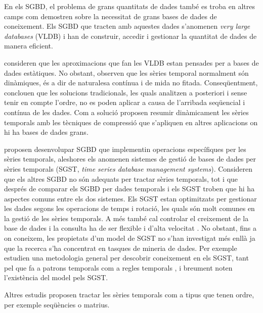  
En els SGBD, el problema de grans quantitats de dades també es troba en altres camps com demostren \textcite{mylopoulos96} sobre la necessitat de grans bases de dades de coneixement. Els SGBD que tracten amb aquestes dades s'anomenen \emph{very large databases} (VLDB) i han de construir, accedir i gestionar la quantitat de dades de manera eficient.

\textcite{ogras06} consideren que les aproximacions que fan les VLDB
estan pensades per a bases de dades estàtiques. No obstant, observen
que les sèries temporal normalment són dinàmiques, és a dir de
naturalesa contínua i de mida no fitada. Conseqüentment, conclouen que
les solucions tradicionals, les quals analitzen a posteriori i sense
tenir en compte l'ordre, no es poden aplicar a causa de l'arribada
seqüencial i contínua de les dades.  Com a solució proposen resumir
dinàmicament les sèries temporals amb les tècniques de compressió que
s'apliquen en altres aplicacions on hi ha bases de dades grans.




\textcite{dreyer94} proposen desenvolupar SGBD que implementin operacions específiques per les sèries temporals, aleshores els anomenen sistemes de gestió de bases de dades per sèries temporals (SGST, \emph{time series database management systems}). Consideren que els altres SGBD no són adequats per tractar sèries temporals, tot i que després de comparar els SGBD per dades temporals i els SGST \parencite{schmidt95} troben que hi ha aspectes comuns entre els dos sistemes.
Els SGST estan optimitzats per gestionar les dades segons les operacions de temps i rotació, les quals són molt comunes en la gestió de les sèries temporals.  A més també cal controlar el creixement de la base de dades i la consulta ha de ser flexible i d'alta velocitat \parencite{keogh10:isax}. 
No obstant, fins a on coneixem, les propietats d'un model de SGST no s'han investigat més enllà  ja que la recerca s'ha concentrat en tasques de mineria de dades. Per exemple \textcite{last01} estudien una metodologia general per descobrir coneixement en els SGST, tant pel que fa a 
patrons temporals %
com a regles temporals%
, i breument noten l'existència del model \cite{dreyer94} pels SGST.


Altres estudis proposen tractar les sèries temporals com a tipus que tenen ordre, per exemple seqüències o matrius.


